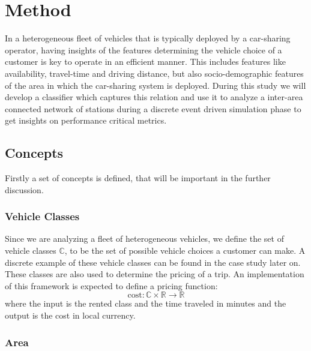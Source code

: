 \clearpage
\section{Method}
\label{sec:Method}

In a heterogeneous fleet of vehicles that is typically deployed by a car-sharing operator,
having insights of the features determining the vehicle choice of a customer is key
to operate in an efficient manner. This includes features like availability, travel-time
and driving distance, but also socio-demographic features of the area in which the
car-sharing system is deployed. During this study we will develop a classifier which 
captures this relation and use it to analyze a inter-area connected network of stations
during a discrete event driven simulation phase to get insights on performance critical
metrics.

\subsection{Concepts}
\label{sub_sec:Method/Concepts}

Firstly a set of concepts is defined, that will be important in the further discussion.

\subsubsection{Vehicle Classes}
\label{sub_sec:Method/Concepts/Classes}

Since we are analyzing a fleet of heterogeneous vehicles, we define the set of vehicle
classes $\mathbb{C}$, to be the set of possible vehicle choices a customer can make. A
discrete example of these vehicle classes can be found in the case study later on. These
classes are also used to determine the pricing of a trip. An implementation of this
framework is expected to define a pricing function:
$$
\text{cost}: \mathbb{C} \times  \mathbb{R} \to \mathbb{R}
$$
where the input is the rented class and the time traveled in minutes and the output is the
cost in local currency.

\subsubsection{Area}
\label{sub_sec:Method/Concepts/Area}

